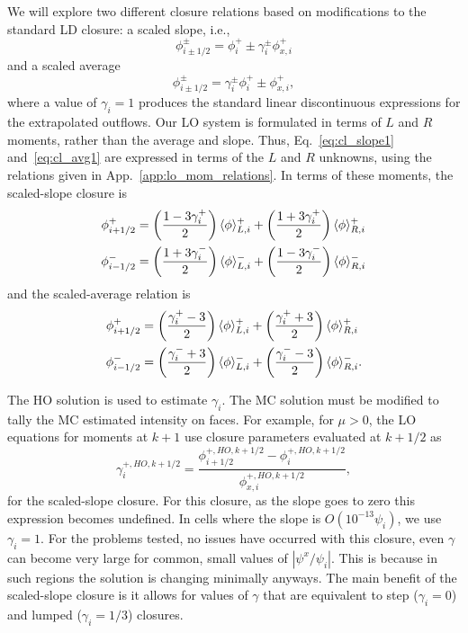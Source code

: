 We will
explore two different closure relations based on modifications to the standard LD closure: a scaled slope, i.e.,
\begin{equation}\label{eq:cl_slope1}
    \phi_{i\pm1/2}^\pm = \phi_i^+ \pm \gamma_i^{\pm} \phi_{x,i}^+
\end{equation}
and a scaled average
\begin{equation}\label{eq:cl_avg1}
    \phi_{i\pm1/2}^\pm = \gamma_i^{\pm} \phi_i^+ \pm \phi_{x,i}^+,
\end{equation}
where a value of $\gamma_i = 1$ produces the standard linear discontinuous expressions for
the extrapolated outflows.  Our LO system is formulated in terms of $L$ and $R$ moments, rather than the average and
slope.  Thus, Eq.~\eqref{eq:cl_slope1} and~\eqref{eq:cl_avg1} are expressed in terms of the $L$ and $R$
unknowns, using the relations given in App.~\ref{app:lo_mom_relations}.  In terms of these
moments, the scaled-slope closure is
\begin{align}\label{eq:cl_slope}
    \phi_{i+1/2}^+  &= \left(\frac{\displaystyle 1 - 3 \gamma_i^+}{\displaystyle 2 }  \right)
    \langle \phi \rangle_{L,i}^+ + \left(\frac{\displaystyle 1 + 3 \gamma_i^+}{\displaystyle 2 }  \right)
    \langle \phi \rangle_{R,i}^+ \\
    \phi_{i-1/2}^-  &= \left(\frac{\displaystyle 1 + 3 \gamma_i^-}{\displaystyle 2 }  \right)
    \langle \phi \rangle_{L,i}^- + \left(\frac{\displaystyle 1 - 3 \gamma_i^-}{\displaystyle 2 }  \right)
    \langle \phi \rangle_{R,i}^- 
\end{align}
and the scaled-average relation is
\begin{align}\label{eq:cl_avg}
    \phi_{i+1/2}^+  &= \left(\frac{\displaystyle  \gamma_i^+ - 3}{\displaystyle 2 }  \right)
    \langle \phi \rangle_{L,i}^+ + \left(\frac{\displaystyle \gamma_i^+ + 3}{\displaystyle 2 }  \right)
    \langle \phi \rangle_{R,i}^+ \\
    \phi_{i-1/2}^-  &= \left(\frac{\displaystyle \gamma_i^- + 3}{\displaystyle 2 }  \right)
    \langle \phi \rangle_{L,i}^- + \left(\frac{\displaystyle \gamma_i^- - 3}{\displaystyle 2 }  \right)
    \langle \phi \rangle_{R,i}^- .
\end{align}

The HO solution is used to estimate $\gamma_i$. The MC solution must be modified
to tally the MC estimated intensity on faces. For example, for $\mu>0$, the LO equations for
moments at $k+1$ use closure parameters evaluated at $k+1/2$ as
\begin{equation}
    \gamma_i^{+,HO,k+1/2} = \frac{\phi_{i+1/2}^{+,HO,k+1/2} -
    \phi_{i}^{+,HO,k+1/2}}{\phi_{x,i}^{+,HO,k+1/2}},
\end{equation}
for the scaled-slope closure.  For this closure, as the slope goes to zero this expression
becomes undefined.  In cells where the slope is $O(10^{-13} \psi_i)$, we use $\gamma_i=1$.
For the problems tested, no issues have occurred with this closure, even $\gamma$
can become very large for common, small values of $|\psi^x/\psi_i|$.  This is because in
such regions the solution is changing minimally anyways. 
The main benefit of the scaled-slope closure is it allows for values of $\gamma$ that are
equivalent to step ($\gamma_i=0$) and lumped ($\gamma_i=1/3$) closures.


